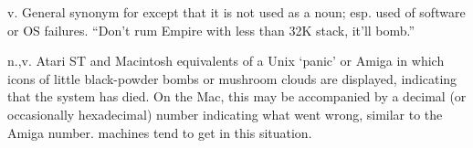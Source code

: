 
\begin{inparaenum}
\item v. General synonym for  except that it is not used
    as a noun; esp. used of software or OS failures. ``Don't rum Empire with
    less than 32K stack, it'll bomb.''
\item n.,v. Atari ST and Macintosh equivalents of a Unix `panic' or Amiga
     in which icons of little black-powder bombs or mushroom
    clouds are displayed, indicating that the system has died. On the Mac, this
    may be accompanied by a decimal (or occasionally hexadecimal) number
    indicating what went wrong, similar to the Amiga 
    number.  machines tend to get  in
    this situation.
\end{inparaenum}

